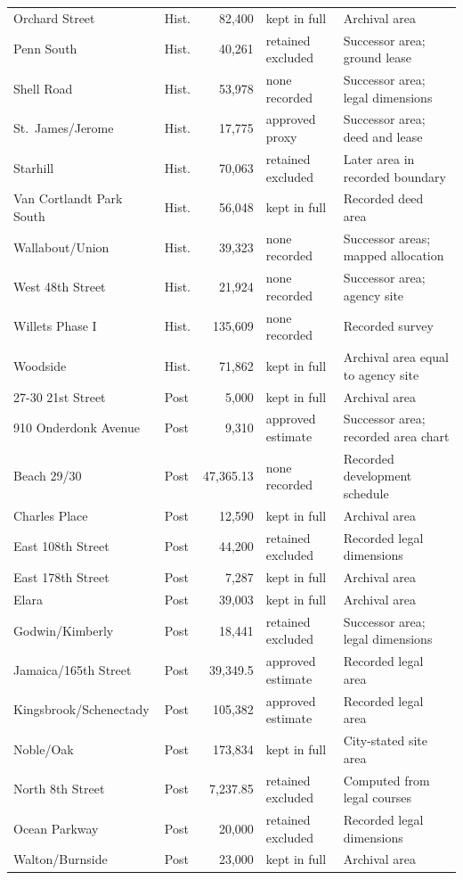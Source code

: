 \begin{center}
\begin{tabular}{llrll}
Orchard Street & Hist. & 82,400 & kept in full & Archival area \\
Penn South & Hist. & 40,261 & retained excluded & Successor area; ground lease \\
Shell Road & Hist. & 53,978 & none recorded & Successor area; legal dimensions \\
St.~James/Jerome & Hist. & 17,775 & approved proxy & Successor area; deed and lease \\
Starhill & Hist. & 70,063 & retained excluded & Later area in recorded boundary \\
Van Cortlandt Park South & Hist. & 56,048 & kept in full & Recorded deed area \\
Wallabout/Union & Hist. & 39,323 & none recorded & Successor areas; mapped allocation \\
West 48th Street & Hist. & 21,924 & none recorded & Successor area; agency site \\
Willets Phase I & Hist. & 135,609 & none recorded & Recorded survey \\
Woodside & Hist. & 71,862 & kept in full & Archival area equal to agency site \\
27-30 21st Street & Post & 5,000 & kept in full & Archival area \\
910 Onderdonk Avenue & Post & 9,310 & approved estimate & Successor area; recorded area chart \\
Beach 29/30 & Post & 47,365.13 & none recorded & Recorded development schedule \\
Charles Place & Post & 12,590 & kept in full & Archival area \\
East 108th Street & Post & 44,200 & retained excluded & Recorded legal dimensions \\
East 178th Street & Post & 7,287 & kept in full & Archival area \\
Elara & Post & 39,003 & kept in full & Archival area \\
Godwin/Kimberly & Post & 18,441 & retained excluded & Successor area; legal dimensions \\
Jamaica/165th Street & Post & 39,349.5 & approved estimate & Recorded legal area \\
Kingsbrook/Schenectady & Post & 105,382 & approved estimate & Recorded legal area \\
Noble/Oak & Post & 173,834 & kept in full & City-stated site area \\
North 8th Street & Post & 7,237.85 & retained excluded & Computed from legal courses \\
Ocean Parkway & Post & 20,000 & retained excluded & Recorded legal dimensions \\
Walton/Burnside & Post & 23,000 & kept in full & Archival area \\
\hline
\end{tabular}
\end{center}
